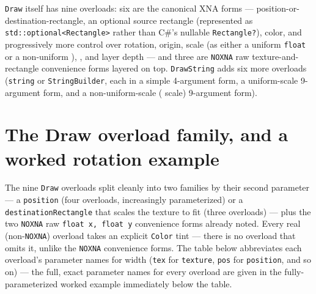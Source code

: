 \texttt{Draw} itself has nine overloads: six are the canonical XNA forms ---
position-or-destination-rectangle, an optional source rectangle (represented as
\texttt{std::optional<Rectangle>} rather than C\#'s nullable \texttt{Rectangle?}), color, and
progressively more control over rotation, origin, scale (as either a uniform \texttt{float} or
a non-uniform ), , and layer depth --- and three are
\texttt{NOXNA} raw texture-and-rectangle convenience forms layered on top.
\texttt{DrawString} adds six more overloads (\texttt{string} or \texttt{StringBuilder}, each in
a simple 4-argument form, a uniform-scale 9-argument form, and a non-uniform-scale
( scale) 9-argument form).

\section{The Draw overload family, and a worked rotation example}

The nine \texttt{Draw} overloads split cleanly into two families by their second parameter ---
a  \texttt{position} (four overloads, increasingly parameterized) or a
 \texttt{destinationRectangle} that scales the texture to fit (three
overloads) --- plus the two \texttt{NOXNA} raw \texttt{float x, float y} convenience forms
already noted. Every real (non-\texttt{NOXNA}) overload takes an explicit \texttt{Color} tint
--- there is no overload that omits it, unlike the \texttt{NOXNA} convenience forms. The table
below abbreviates each overload's parameter names for width (\texttt{tex} for \texttt{texture},
\texttt{pos} for \texttt{position}, and so on) --- the full, exact parameter names for every
overload are given in the fully-parameterized worked example immediately below the table.

